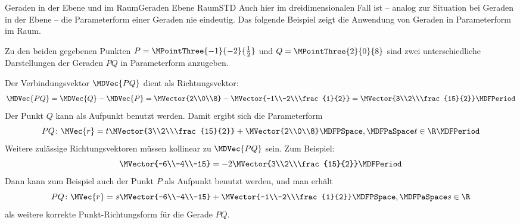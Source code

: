 \begin{MXContent}{Geraden in der Ebene und im Raum}{Geraden Ebene Raum}{STD}
Auch hier im dreidimensionalen Fall ist -- analog zur Situation bei Geraden in der Ebene -- die Parameterform einer Geraden nie eindeutig. Das folgende Beispiel zeigt die Anwendung von Geraden in Parameterform im Raum.

\begin{MExample}
Zu den beiden gegebenen Punkten $P=\MPointThree{-1}{-2}{\frac{1}{2}}$ und $Q=\MPointThree{2}{0}{8}$ sind zwei unterschiedliche Darstellungen der Geraden $P Q$ in Parameterform anzugeben.

Der Verbindungsvektor $\MDVec{P Q}$ dient als Richtungsvektor:
\[
 \MDVec{P Q}=\MDVec{Q}-\MDVec{P}=\MVector{2\\0\\8}-\MVector{-1\\-2\\\frac{1}{2}}=\MVector{3\\2\\\frac{15}{2}}\MDFPeriod
\]
Der Punkt $Q$ kann als Aufpunkt benutzt werden. Damit ergibt sich die Parameterform
\[
 P Q\colon \MVec{r}=t\MVector{3\\2\\\frac{15}{2}}+\MVector{2\\0\\8}\MDFPSpace,\MDFPaSpace t\in\R\MDFPeriod
\]
Weitere zulässige Richtungsvektoren müssen kollinear zu $\MDVec{P Q}$ sein. Zum Beispiel:
\[
 \MVector{-6\\-4\\-15}=-2\MVector{3\\2\\\frac{15}{2}}\MDFPeriod
\]
Dann kann zum Beispiel auch der Punkt $P$ als Aufpunkt benutzt werden, und man erhält
\[
 P Q\colon \MVec{r}=s\MVector{-6\\-4\\-15}+\MVector{-1\\-2\\\frac{1}{2}}\MDFPSpace,\MDFPaSpace s\in\R
\]
als weitere korrekte Punkt-Richtungsform für die Gerade $P Q$.
\end{MExample}


\end{MXContent}
